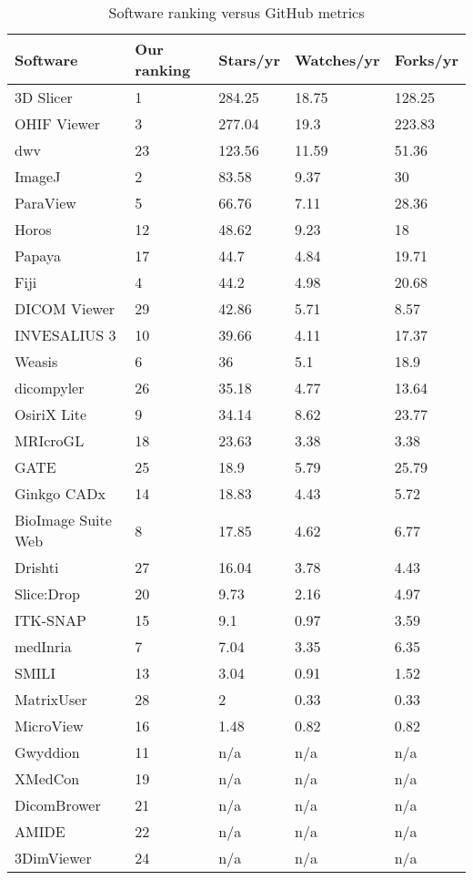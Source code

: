 \begingroup
\renewcommand{\arraystretch}{0.85}
\begin{table}[H]
\centering
\begin{tabular}{lllll}
\hline
Software & Our ranking & Stars/yr & Watches/yr & Forks/yr \\ \hline
3D Slicer & 1 & 284.25 & 18.75 & 128.25 \\
OHIF Viewer & 3 & 277.04 & 19.3 & 223.83 \\
dwv & 23 & 123.56 & 11.59 & 51.36 \\
ImageJ & 2 & 83.58 & 9.37 & 30 \\
ParaView & 5 & 66.76 & 7.11 & 28.36 \\
Horos & 12 & 48.62 & 9.23 & 18 \\
Papaya & 17 & 44.7 & 4.84 & 19.71 \\
Fiji & 4 & 44.2 & 4.98 & 20.68 \\
DICOM Viewer & 29 & 42.86 & 5.71 & 8.57 \\
INVESALIUS 3 & 10 & 39.66 & 4.11 & 17.37 \\
Weasis & 6 & 36 & 5.1 & 18.9 \\
dicompyler & 26 & 35.18 & 4.77 & 13.64 \\
OsiriX Lite & 9 & 34.14 & 8.62 & 23.77 \\
MRIcroGL & 18 & 23.63 & 3.38 & 3.38 \\
GATE & 25 & 18.9 & 5.79 & 25.79 \\
Ginkgo CADx & 14 & 18.83 & 4.43 & 5.72 \\
BioImage Suite Web & 8 & 17.85 & 4.62 & 6.77 \\
Drishti & 27 & 16.04 & 3.78 & 4.43 \\
Slice:Drop & 20 & 9.73 & 2.16 & 4.97 \\
ITK-SNAP & 15 & 9.1 & 0.97 & 3.59 \\
medInria & 7 & 7.04 & 3.35 & 6.35 \\
SMILI & 13 & 3.04 & 0.91 & 1.52 \\
MatrixUser & 28 & 2 & 0.33 & 0.33 \\
MicroView & 16 & 1.48 & 0.82 & 0.82 \\
Gwyddion & 11 & n/a & n/a & n/a \\
XMedCon & 19 & n/a & n/a & n/a \\
DicomBrower & 21 & n/a & n/a & n/a \\
AMIDE & 22 & n/a & n/a & n/a \\
3DimViewer & 24 & n/a & n/a & n/a \\ \hline
\end{tabular}
\caption{\label{tab_ranking_vs_GitHub}Software ranking versus GitHub metrics}
\end{table}
\endgroup


